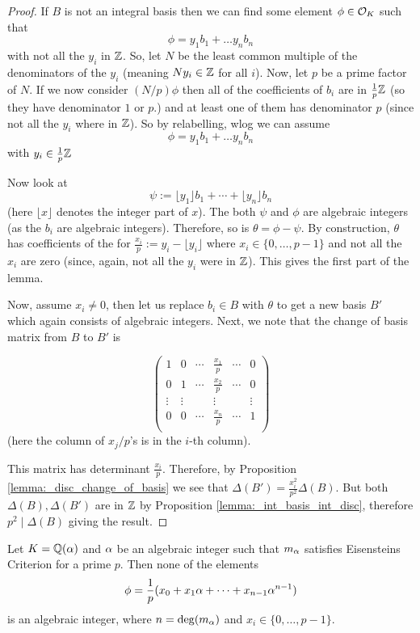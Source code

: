 \begin{proof}
	If $B$ is not an integral basis then we can find some element $\phi \in \mathcal{O}_K$ such that \[\phi=y_1b_1+\dots y_nb_n\] with not all the $y_i$ in $\mathbb{Z}$. So, let $N$ be the least common multiple of the denominators of the $y_i$ (meaning $Ny_i \in \mathbb{Z}$ for all $i$). Now, let $p$ be a prime factor of $N$. If we now consider $(N/p)\phi$ then all of the coefficients of $b_i$ are in $\frac{1}{p} \mathbb{Z}$ (so they have denominator $1$ or $p$.) and at least one of them has denominator $p$ (since not all the $y_i$ where in $\mathbb{Z}$). So by relabelling, wlog we can assume \[\phi=y_1b_1+\dots y_nb_n\] with $y_i \in  \frac{1}{p} \mathbb{Z}$
	
	Now look at \[\psi:=\lfloor y_1 \rfloor b_1+\cdots+\lfloor y_n \rfloor b_n\] (here $\lfloor x \rfloor$ denotes the integer part of $x$). The both $\psi$ and $\phi$ are algebraic integers (as the $b_i$ are algebraic integers). Therefore, so is $\theta=\phi-\psi$. By construction, $\theta$ has coefficients of the for $\frac{x_i}{p}:=y_i-\lfloor y_i \rfloor$ where $x_i \in \{0,\dots,p-1\}$ and not all the $x_i$ are zero (since, again, not all the $y_i$ were in $\mathbb{Z}$). This gives the first part of the lemma.
	
	Now, assume $x_i \neq 0$, then let us replace $b_i \in B$ with $\theta$ to get a new basis $B'$ which again consists of algebraic integers. Next, we note that the change of basis matrix from $B$ to $B'$ is 
	
	\[ \left( \begin{matrix}
		1&0&\cdots& \frac{x_1}{p}& \cdots &0 \\
		0&1&\cdots& \frac{x_2}{p}& \cdots &0 \\
		\vdots& \vdots&&\vdots&&\vdots \\
		0&0&\cdots& \frac{x_n}{p}& \cdots &1 \\
	\end{matrix}                          \right) \](here the column of $x_j/p$'s is in the $i$-th column).
	
	This matrix has determinant $\frac{x_i}{p}.$ Therefore, by 	Proposition \ref{lemma:_disc_change_of_basis} we see that $\Delta(B')=\frac{x_i^2}{p^2}\Delta(B)$. But both $\Delta(B),\Delta(B')$ are  in $\mathbb{Z}$ by Proposition \ref{lemma:_int_basis_int_disc}, therefore $p^2 \mid \Delta(B)$ giving the result.
\end{proof}

\begin{lemma}\label{lemma:_eis_crit_and_alg_ints}
	Let $K=\mathbb{Q}(\alpha)$ and $\alpha$ be an algebraic integer such that $m_\alpha$ satisfies Eisensteins Criterion for a prime $p$. Then none of the elements \[\phi=\frac{1}{p}(x_0+x_1\alpha+\cdots+x_{n-1}\alpha^{n-1})\] is an algebraic integer, where $n=\deg(m_\alpha)$ and $x_i \in \{0,\dots,p-1\}.$
\end{lemma} 


